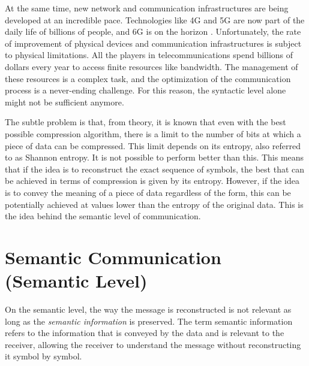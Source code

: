 At the same time, new network and communication infrastructures are being developed at an incredible pace. Technologies like 4G and 5G are now part of the daily life of billions of people, and 6G is on the horizon \cite{Saad2019Vision6G}. Unfortunately, the rate of improvement of physical devices and communication infrastructures is subject to physical limitations. All the players in telecommunications spend billions of dollars every year to access finite resources like bandwidth. The management of these resources is a complex task, and the optimization of the communication process is a never-ending challenge. For this reason, the syntactic level alone might not be sufficient anymore.

The subtle problem is that, from theory, it is known that even with the best possible compression algorithm, there is a limit to the number of bits at which a piece of data can be compressed. This limit depends on its entropy, also referred to as Shannon entropy. It is not possible to perform better than this. This means that if the idea is to reconstruct the exact sequence of symbols, the best that can be achieved in terms of compression is given by its entropy. However, if the idea is to convey the meaning of a piece of data regardless of the form, this can be potentially achieved at values lower than the entropy of the original data. This is the idea behind the semantic level of communication.

\section{Semantic Communication (Semantic Level)}\label{sec: SEMCOM sem}
On the semantic level, the way the message is reconstructed is not relevant as long as the \textit{semantic information} is preserved. The term semantic information refers to the information that is conveyed by the data and is relevant to the receiver, allowing the receiver to understand the message without reconstructing it symbol by symbol.

